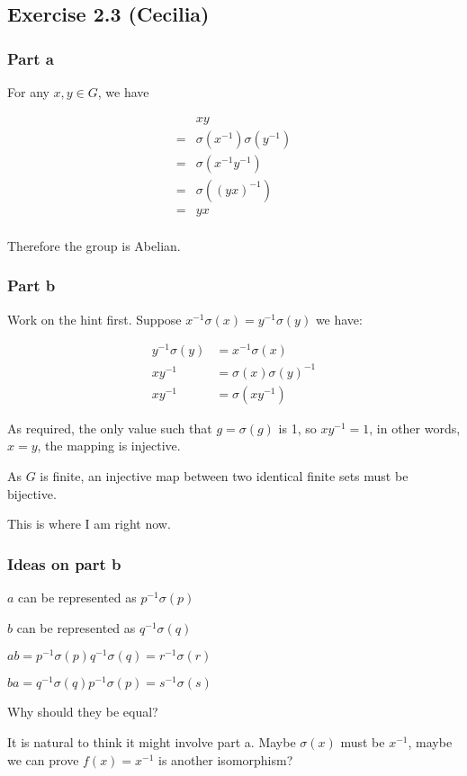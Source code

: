 \subsection*{Exercise 2.3 (Cecilia)}

\subsubsection*{Part a}
For any $ x, y \in G $, we have

\begin{align*}
   & xy \\
  =& \sigma(x^{-1}) \sigma(y^{-1}) \\
  =& \sigma(x^{-1}y^{-1}) \\
  =& \sigma((yx)^{-1}) \\
  =& yx \\
\end{align*}

Therefore the group is Abelian.

\subsubsection*{Part b}

Work on the hint first. Suppose $ x^{-1}\sigma(x) = y^{-1}\sigma(y) $ we have:

\begin{align*}
   y^{-1}\sigma(y) &= x^{-1}\sigma(x) \\
           xy^{-1} &= \sigma(x)\sigma(y)^{-1} \\
           xy^{-1} &= \sigma(xy^{-1})
\end{align*}

As required, the only value such that $ g = \sigma(g) $ is 1, so $ xy^{-1} = 1 $, in other words, $ x = y $, the mapping is injective.

As $ G $ is finite, an injective map between two identical finite sets must be bijective. 

This is where I am right now.

\subsubsection*{Ideas on part b}

$ a $ can be represented as $ p^{-1} \sigma(p) $

$ b $ can be represented as $ q^{-1} \sigma(q) $

$ ab = p^{-1} \sigma(p) q^{-1} \sigma(q) = r^{-1} \sigma(r) $

$ ba = q^{-1} \sigma(q) p^{-1} \sigma(p) = s^{-1} \sigma(s) $

Why should they be equal?

It is natural to think it might involve part a. Maybe $ \sigma(x) $ must be $ x^{-1} $, maybe we can prove $ f(x) = x^{-1} $ is another isomorphism?
